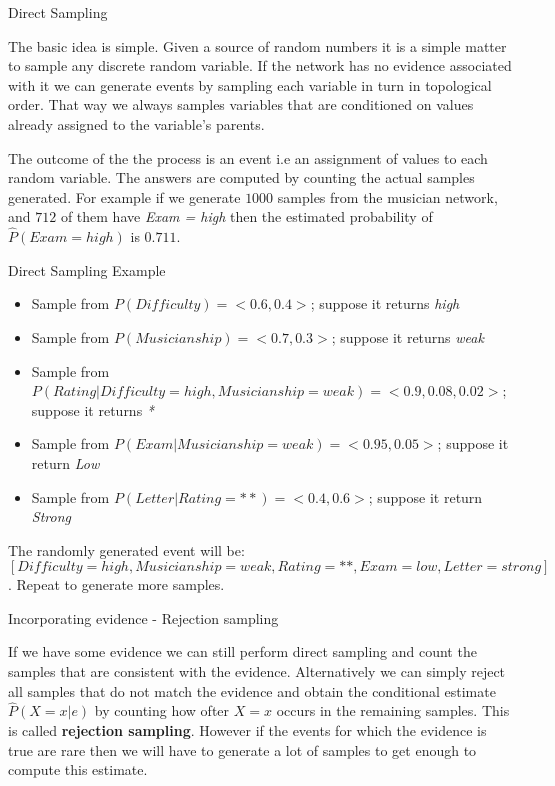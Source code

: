 \documentclass[12pt]{beamer}
\begin{document}
\begin{frame}{Direct Sampling}

  The basic idea is simple. Given a source of random numbers it is a
  simple matter to sample any discrete random variable. If the network
  has no evidence associated with it we can generate events by
  sampling each variable in turn in topological order. That way we
  always samples variables that are conditioned on values already
  assigned to the variable's parents.

  The outcome of the the process is an event i.e an assignment of
  values to each random variable. The answers are computed by counting
  the actual samples generated. For example if we generate $1000$
  samples from the musician network, and $712$ of them have {\it Exam =
    high} then the estimated probability of $\hat P(Exam = high)$ is
  $0.711$.
\end{frame}

\begin{frame}{Direct Sampling Example}
 \begin{itemize}
 \item Sample from $P(Difficulty) = <0.6,0.4>$; suppose it returns {\it high}
 \item Sample from $P(Musicianship) = <0.7,0.3>$; suppose it returns {\it weak}
   \item Sample from $P(Rating|Difficulty = high, Musicianship=weak) = <0.9, 0.08, 0.02>$; suppose it returns {\it **} 
   \item Sample from $P(Exam|Musicianship=weak)=<0.95,0.05>$; suppose it return {\it Low}
     \item Sample from $P(Letter|Rating=**)=<0.4, 0.6>$; suppose it return {\it Strong} 
   \end{itemize} 
 The randomly generated event will be: $[Difficulty=high, Musicianship=weak, Rating=**, Exam = low, Letter = strong]$. Repeat to generate more samples. 
\end{frame} 
  

\begin{frame}{Incorporating evidence - Rejection sampling}


  If we have some evidence we can still perform direct sampling and
  count the samples that are consistent with the
  evidence. Alternatively we can simply reject all samples that do not
  match the evidence and obtain the conditional estimate $\hat
  P(X=x|e)$ by counting how ofter $X=x$ occurs in the remaining
  samples. This is called {\bf rejection sampling}. However if the
  events for which the evidence is true are rare then we will have to
  generate a lot of samples to get enough to compute this estimate.
\end{frame} 
\end{document}
